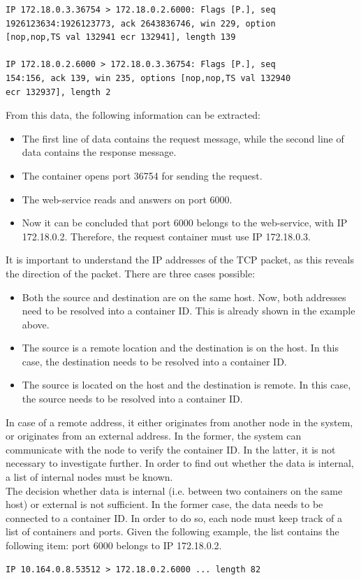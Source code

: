 \begin{verbatim}
IP 172.18.0.3.36754 > 172.18.0.2.6000: Flags [P.], seq
1926123634:1926123773, ack 2643836746, win 229, option
[nop,nop,TS val 132941 ecr 132941], length 139

IP 172.18.0.2.6000 > 172.18.0.3.36754: Flags [P.], seq
154:156, ack 139, win 235, options [nop,nop,TS val 132940 
ecr 132937], length 2
\end{verbatim}
From this data, the following information can be extracted:
\begin{itemize}
    \item The first line of data contains the request message, while the second line of data contains the response message.    
    \item The container opens port 36754 for sending the request.
    \item The web-service reads and answers on port 6000.
    \item Now it can be concluded that port 6000 belongs to the web-service, with IP 172.18.0.2. Therefore, the request container must use IP 172.18.0.3.
\end{itemize}
It is important to understand the IP addresses of the TCP packet, as this reveals the direction of the packet. There are three cases possible:
\begin{itemize}
    \item Both the source and destination are on the same host. Now, both addresses need to be resolved into a container ID. This is already shown in the example above.
    \item The source is a remote location and the destination is on the host. In this case, the destination needs to be resolved into a container ID.
    \item The source is located on the host and the destination is remote. In this case, the source needs to be resolved into a container ID.
\end{itemize}

\noindent
In case of a remote address, it either originates from another node in the system, or originates from an external address. In the former, the system can communicate with the node to verify the container ID. In the latter, it is not necessary to investigate further. In order to find out whether the data is internal, a list of internal nodes must be known.\\

\noindent
The decision whether data is internal (i.e. between two containers on the same host) or external is not sufficient. In the former case, the data needs to be connected to a container ID. In order to do so, each node must keep track of a list of containers and ports. Given the following example, the list contains the following item: port 6000 belongs to IP 172.18.0.2.
\begin{verbatim}
IP 10.164.0.8.53512 > 172.18.0.2.6000 ... length 82
\end{verbatim}

